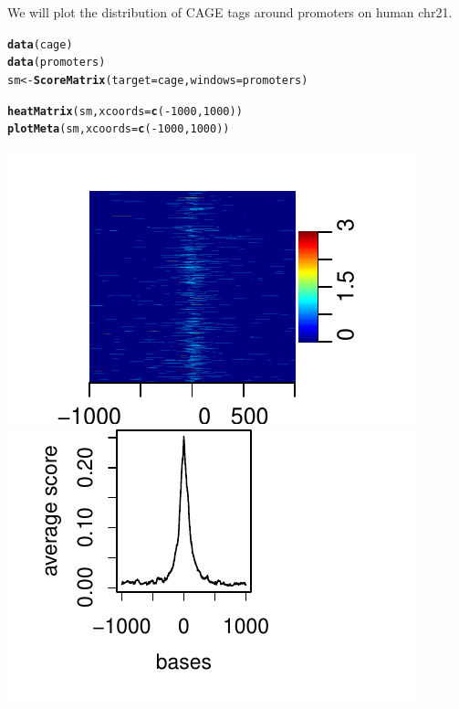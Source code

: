 \documentclass{article}\usepackage[]{graphicx}\usepackage[]{color}
\makeatletter
\def\maxwidth{ %
  \ifdim\Gin@nat@width>\linewidth
    \linewidth
  \else
    \Gin@nat@width
  \fi
}
\newcommand{\hlnum}[1]{\textcolor[rgb]{0.686,0.059,0.569}{#1}}%
\newcommand{\hlopt}[1]{\textcolor[rgb]{0,0,0}{#1}}%
\newcommand{\hlstd}[1]{\textcolor[rgb]{0.345,0.345,0.345}{#1}}%
\newcommand{\hlkwb}[1]{\textcolor[rgb]{0.69,0.353,0.396}{#1}}%
\newcommand{\hlkwc}[1]{\textcolor[rgb]{0.333,0.667,0.333}{#1}}%
\newcommand{\hlkwd}[1]{\textcolor[rgb]{0.737,0.353,0.396}{\textbf{#1}}}%
\newenvironment{kframe}{%
 \def\at@end@of@kframe{}%
 \ifinner\ifhmode%
  \def\at@end@of@kframe{\end{minipage}}%
  \begin{minipage}{\columnwidth}%
 \fi\fi%
 \def\FrameCommand##1{\hskip\@totalleftmargin \hskip-\fboxsep
 \colorbox{shadecolor}{##1}\hskip-\fboxsep
     \hskip-\linewidth \hskip-\@totalleftmargin \hskip\columnwidth}%
 \MakeFramed {\advance\hsize-\width
   \@totalleftmargin\z@ \linewidth\hsize
   \@setminipage}}%
 {\par\unskip\endMakeFramed%
 \at@end@of@kframe}
\newenvironment{knitrout}{}{} %
\makeatother
\begin{document}
We will plot the distribution of CAGE tags around promoters on human chr21.

\begin{knitrout}
\color{fgcolor}\begin{kframe}
\begin{alltt}
\hlkwd{data}\hlstd{(cage)}
\hlkwd{data}\hlstd{(promoters)}
\hlstd{sm} \hlkwb{<-} \hlkwd{ScoreMatrix}\hlstd{(}\hlkwc{target} \hlstd{= cage,} \hlkwc{windows} \hlstd{= promoters)}

\hlkwd{heatMatrix}\hlstd{(sm,} \hlkwc{xcoords} \hlstd{=} \hlkwd{c}\hlstd{(}\hlopt{-}\hlnum{1000}\hlstd{,} \hlnum{1000}\hlstd{))}
\hlkwd{plotMeta}\hlstd{(sm,} \hlkwc{xcoords} \hlstd{=} \hlkwd{c}\hlstd{(}\hlopt{-}\hlnum{1000}\hlstd{,} \hlnum{1000}\hlstd{))}
\end{alltt}
\end{kframe}

{\centering \includegraphics[width=\maxwidth]{FiguresheatMatrix11} 
\includegraphics[width=\maxwidth]{FiguresheatMatrix12} 

}



\end{knitrout}
\end{document}
